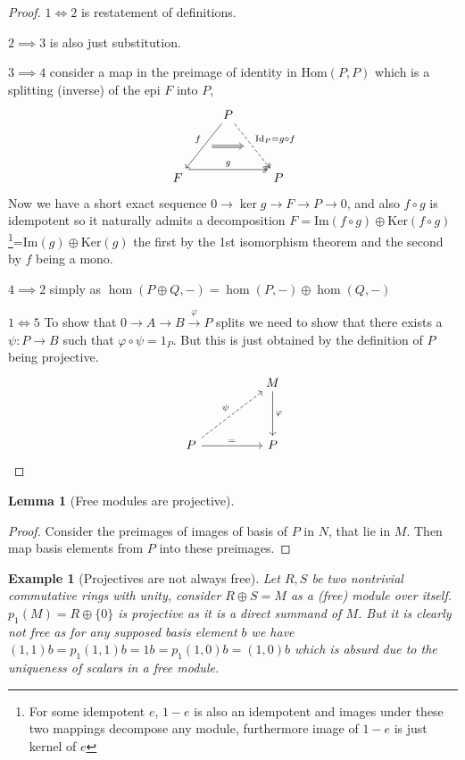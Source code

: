 \documentclass[12pt]{article}
\numberwithin{equation}{section}
\newcommand{\Hom}{{\mathrm{Hom}}}
\newcommand{\image}{{\mathrm{Im}}}
\newcommand{\kernel}{{\mathrm{Ker}}}
\newcounter{dummy} \numberwithin{dummy}{section}
\newtheorem{lemma}[dummy]{Lemma}
\newtheorem{example}[dummy]{Example}
\begin{document}
	\begin{proof}
		$1 \iff 2$ is restatement of definitions.
		
		$2 \implies 3$ is also just substitution.
		
		$3 \implies 4$ consider a map in the preimage of identity in $\Hom(P,P)$ which is a splitting (inverse) of the epi $F$ into $P$,
		\[\begin{tikzcd}
			& P \\
			\\
			F && P
			\arrow["g", shift left=3, two heads, from=3-1, to=3-3]
			\arrow[""{name=0, anchor=center, inner sep=0}, "f"', from=1-2, to=3-1]
			\arrow[""{name=1, anchor=center, inner sep=0}, "{\mathrm{Id}_P=g \circ f}", dashed, two heads, from=1-2, to=3-3]
			\arrow[shorten <=6pt, shorten >=6pt, Rightarrow, from=0, to=1]
		\end{tikzcd}\]
		Now we have a short exact sequence $0 \to \ker g \to F \to P \to 0$, and also $f\circ g $ is idempotent so it naturally admits a decomposition $F = \image(f \circ g) \oplus \kernel (f \circ g)$\footnote{For some idempotent $e$, $1-e$ is also an idempotent and images under these two mappings decompose any module, furthermore image of $1-e$ is just kernel of $e$}=$\image (g) \oplus \kernel (g)$ the first by the 1st isomorphism theorem and the second by $f $ being a mono.
		
		$4 \implies 2$ simply as $\hom (P \oplus Q,-) = \hom(P,-) \oplus \hom(Q,-)$
		
		$1 \iff 5$ To show that $0\to A \to B \xrightarrow{\varphi} P$ splits we need to show that there exists a $\psi: P \to B$ such that $\varphi \circ \psi = 1_P$. But this is just obtained by the definition of $P$ being projective.
		\[\begin{tikzcd}
			&& M \\
			\\
			P && P
			\arrow["\varphi", from=1-3, to=3-3]
			\arrow["\psi", dashed, from=3-1, to=1-3]
			\arrow["{=}", from=3-1, to=3-3]
		\end{tikzcd}\]
		
	\end{proof}
	\begin{lemma}[Free modules are projective]
	\end{lemma}
	\begin{proof}
		Consider the preimages of images of basis of $P$ in $N$, that lie in $M$. Then map basis elements from $P$ into these preimages.
	\end{proof}
	\begin{example}[Projectives are not always free]
		Let $R,S $ be two nontrivial commutative rings with unity, consider $R \oplus S = M$ as a (free) module over itself. $p_1(M)=R \oplus \{0\}$ is projective as it is a direct summand of $M$. But it is clearly not free as for any supposed basis element $b$ we have $(1,1) b = p_1 (1,1) b=1b=p_1(1,0) b=(1,0)b$ which is absurd due to the uniqueness of scalars in a free module.
	\end{example}
	
\end{document}
